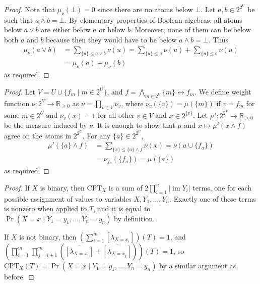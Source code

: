 \documentclass{uai2021} %
\theoremstyle{definition}
\DeclareMathOperator{\im}{im}
\begin{document}
\measure*
\begin{proof}
  Note that $\mu_\nu(\bot) = 0$ since there are no atoms below $\bot$. Let $a, b
  \in 2^{2^{U}}$ be such that $a \land b = \bot$. By elementary properties of
  Boolean algebras, all atoms below $a \lor b$ are either below $a$ or below
  $b$. Moreover, none of them can be below both $a$ and $b$ because then they
  would have to be below $a \land b = \bot$. Thus
  \begin{align*}
    \mu_\nu(a \lor b) &= \sum_{\{u\} \le a \lor b} \nu(u) = \sum_{\{u\} \le a} \nu(u) + \sum_{\{u\} \le b} \nu(u) \\
                      &= \mu_\nu(a) + \mu_\nu(b)
  \end{align*}
  as required.
\end{proof}

\extendable*
\begin{proof}
  Let $V = U \cup \{ f_m \mid m \in 2^U \}$, and $f = \bigwedge_{m \in 2^U} \{ m
  \} \leftrightarrow f_m$. We define weight function $\nu\colon 2^V \to
  \mathbb{R}_{\ge 0}$ as $\nu = \prod_{v \in V} \nu_v$, where $\nu_v(\{v\}) =
  \mu(\{m\})$ if $v = f_m$ for some $m \in 2^U$ and $\nu_v(x) = 1$ for all other
  $v \in V$ and $x \in 2^{\{v\}}$. Let $\mu'\colon 2^{2^V} \to \mathbb{R}_{\ge
    0}$ be the measure induced by $\nu$. It is enough to show that $\mu$ and $x
  \mapsto \mu'(x \land f)$ agree on the atoms in $2^{2^U}$. For any $\{ a \} \in
  2^{2^U}$,
  \begin{align*}
    \mu'(\{ a \} \land f) &= \sum_{\{ x \} \le \{ a \} \land f} \nu(x) = \nu(a \cup \{ f_a \}) \\
                          &= \nu_{f_a}(\{ f_a \}) = \mu(\{ a \})
  \end{align*}
  as required.
\end{proof}

\cptlemma*
\begin{proof}
  If $X$ is binary, then $\mathrm{CPT}_X$ is a sum of $2\prod_{i=1}^n |\im
  Y_i|$ terms, one for each possible assignment of values to variables $X, Y_1,
  \dots, Y_n$. Exactly one of these terms is nonzero when applied to $T$, and
  it is equal to $\Pr(X = x \mid Y_1 = y_1, \dots, Y_n = y_n)$ by definition.

  If $X$ is not binary, then $\left( \sum_{i=1}^m [\lambda_{X = x_i}]
  \right)(T) = 1$, and $\left( \prod_{i=1}^m \prod_{j=i+1}^m
    (\overline{[\lambda_{X = x_i}]} + \overline{[\lambda_{X = x_j}]})
  \right)(T) = 1$, so $\mathrm{CPT}_X(T) = \Pr(X = x \mid Y_1 = y_1,
  \dots, Y_n = y_n)$ by a similar argument as before.
\end{proof}
\end{document}
